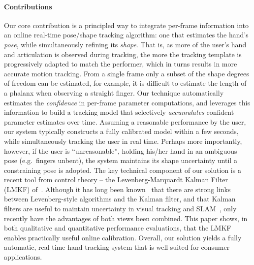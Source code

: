 \paragraph{Contributions}
Our core contribution is a principled way to integrate per-frame information into an online real-time pose/shape tracking algorithm: one that estimates the hand's \emph{pose}, while simultaneously refining its \emph{shape}. That is, as more of the user's hand and articulation is observed during tracking, the more the tracking template is progressively adapted to match the performer, which in turns results in more accurate motion tracking. 
From a single frame only a subset of the shape degrees of freedom can be estimated, for example, it is difficult to estimate the length of a phalanx when observing a straight finger.
Our technique automatically estimates the \emph{confidence} in per-frame parameter computations, and leverages this information to build a tracking model that selectively \emph{accumulates} confident parameter estimates over time. Assuming a reasonable performance by the user, our system typically constructs a fully calibrated model within a few seconds, while simultaneously tracking the user in real time.  Perhaps more importantly, however, if the user is ``unreasonable'', holding his/her hand in an ambiguous pose (e.g.~fingers unbent), the system maintains its shape uncertainty until a constraining pose is adopted.
The key technical component of our solution is a recent tool from control theory -- the Levenberg-Marquardt Kalman Filter (LMKF) of~\cite{skoglund2015extended}.  Although it has long been known~\cite{bell1993iterated,bellaire1995new} that there are strong links between Levenberg-style algorithms and the Kalman filter, and that Kalman filters are useful to maintain uncertainty in visual tracking and SLAM~\cite{strasdat2012visual}, only recently have the advantages of both views been combined.   This paper shows, in both qualitative and quantitative performance evaluations, that the LMKF enables practically useful online calibration.
Overall, our solution yields a fully automatic, real-time hand tracking system that is well-suited for consumer applications.

